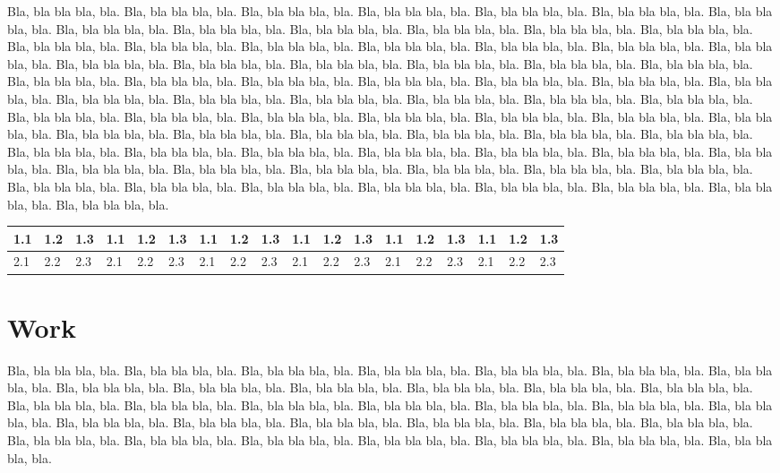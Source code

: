 \documentclass{dd}
\begin{document}
Bla, bla bla bla, bla.
Bla, bla bla bla, bla.
Bla, bla bla bla, bla.
Bla, bla bla bla, bla.
Bla, bla bla bla, bla.
Bla, bla bla bla, bla.
Bla, bla bla bla, bla.
Bla, bla bla bla, bla.
Bla, bla bla bla, bla.
Bla, bla bla bla, bla.
Bla, bla bla bla, bla.
Bla, bla bla bla, bla.
Bla, bla bla bla, bla.
Bla, bla bla bla, bla.
Bla, bla bla bla, bla.
Bla, bla bla bla, bla.
Bla, bla bla bla, bla.
Bla, bla bla bla, bla.
Bla, bla bla bla, bla.
Bla, bla bla bla, bla.
Bla, bla bla bla, bla.
Bla, bla bla bla, bla.
Bla, bla bla bla, bla.
Bla, bla bla bla, bla.
Bla, bla bla bla, bla.
Bla, bla bla bla, bla.
Bla, bla bla bla, bla.
Bla, bla bla bla, bla.
Bla, bla bla bla, bla.
Bla, bla bla bla, bla.
Bla, bla bla bla, bla.
Bla, bla bla bla, bla.
Bla, bla bla bla, bla.
Bla, bla bla bla, bla.
Bla, bla bla bla, bla.
Bla, bla bla bla, bla.
Bla, bla bla bla, bla.
Bla, bla bla bla, bla.
Bla, bla bla bla, bla.
Bla, bla bla bla, bla.
Bla, bla bla bla, bla.
Bla, bla bla bla, bla.
Bla, bla bla bla, bla.
Bla, bla bla bla, bla.
Bla, bla bla bla, bla.
Bla, bla bla bla, bla.
Bla, bla bla bla, bla.
Bla, bla bla bla, bla.
Bla, bla bla bla, bla.
Bla, bla bla bla, bla.
Bla, bla bla bla, bla.
Bla, bla bla bla, bla.
Bla, bla bla bla, bla.
Bla, bla bla bla, bla.
Bla, bla bla bla, bla.
Bla, bla bla bla, bla.
Bla, bla bla bla, bla.
Bla, bla bla bla, bla.
Bla, bla bla bla, bla.
Bla, bla bla bla, bla.
Bla, bla bla bla, bla.
Bla, bla bla bla, bla.
Bla, bla bla bla, bla.
Bla, bla bla bla, bla.
Bla, bla bla bla, bla.
Bla, bla bla bla, bla.
Bla, bla bla bla, bla.
Bla, bla bla bla, bla.
Bla, bla bla bla, bla.
Bla, bla bla bla, bla.
Bla, bla bla bla, bla.
Bla, bla bla bla, bla.
Bla, bla bla bla, bla.

\begin{table*}[t]
\center
\begin{tabular}{|l|l|l|l|l|l|l|l|l|l|l|l|l|l|l|l|l|l|}
   \hline
   \rowcolor{LightCyan}
   1.1 & 1.2 & 1.3 & 1.1 & 1.2 & 1.3 & 1.1 & 1.2 & 1.3 & 1.1 & 1.2 & 1.3 & 1.1 & 1.2 & 1.3 & 1.1 & 1.2 & 1.3 \\
   \hline
   2.1 & 2.2 & 2.3 & 2.1 & 2.2 & 2.3 & 2.1 & 2.2 & 2.3 & 2.1 & 2.2 & 2.3 & 2.1 & 2.2 & 2.3 & 2.1 & 2.2 & 2.3 \\
   \hline
\end{tabular}
\end{table*}

\section{Work}
Bla, bla bla bla, bla.
Bla, bla bla bla, bla.
Bla, bla bla bla, bla.
Bla, bla bla bla, bla.
Bla, bla bla bla, bla.
Bla, bla bla bla, bla.
Bla, bla bla bla, bla.
Bla, bla bla bla, bla.
Bla, bla bla bla, bla.
Bla, bla bla bla, bla.
Bla, bla bla bla, bla.
Bla, bla bla bla, bla.
Bla, bla bla bla, bla.
Bla, bla bla bla, bla.
Bla, bla bla bla, bla.
Bla, bla bla bla, bla.
Bla, bla bla bla, bla.
Bla, bla bla bla, bla.
Bla, bla bla bla, bla.
Bla, bla bla bla, bla.
Bla, bla bla bla, bla.
Bla, bla bla bla, bla.
Bla, bla bla bla, bla.
Bla, bla bla bla, bla.
Bla, bla bla bla, bla.
Bla, bla bla bla, bla.
Bla, bla bla bla, bla.
Bla, bla bla bla, bla.
Bla, bla bla bla, bla.
Bla, bla bla bla, bla.
Bla, bla bla bla, bla.
Bla, bla bla bla, bla.
Bla, bla bla bla, bla.
\end{document}

